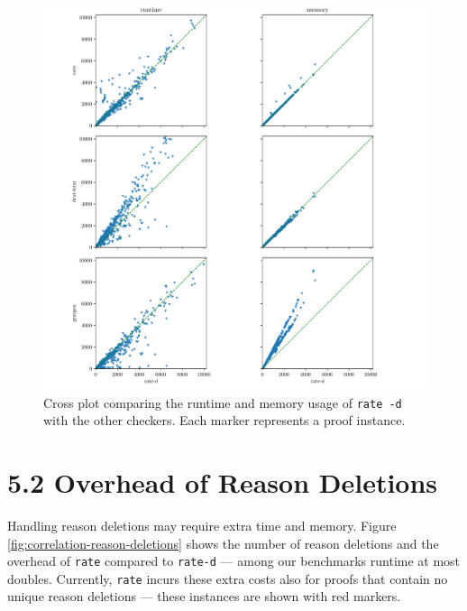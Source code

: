 \documentclass[
]{report}
\begin{document}
\begin{figure}
\centerline{\includegraphics[width=2\textwidth,height=.9\textheight,keepaspectratio]{p/cross.pdf}}
\caption{Cross plot comparing the runtime and memory usage of
\texttt{rate\ -d} with the other checkers. Each marker represents a
proof instance.\label{fig:cross}}
\end{figure}

\hypertarget{overhead-of-reason-deletions}{%
\section{5.2 Overhead of Reason
Deletions}\label{overhead-of-reason-deletions}}

Handling reason deletions may require extra time and memory. Figure
\ref{fig:correlation-reason-deletions} shows the number of reason
deletions and the overhead of \texttt{rate} compared to \texttt{rate-d}
--- among our benchmarks runtime at most doubles. Currently,
\texttt{rate} incurs these extra costs also for proofs that contain no
unique reason deletions --- these instances are shown with red markers.
\end{document}
